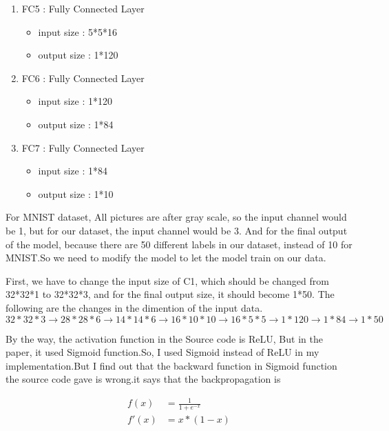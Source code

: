 \documentclass[conference]{IEEEtran}
\begin{document}
\begin{enumerate}
\begin{itemize}
        \end{itemize}
        \item FC5 : Fully Connected Layer
        \begin{itemize}
            \item input size : 5*5*16
            \item output size : 1*120
        \end{itemize}
        \item FC6 : Fully Connected Layer
        \begin{itemize}
            \item input size : 1*120
            \item output size : 1*84
        \end{itemize}
        \item FC7 : Fully Connected Layer
        \begin{itemize}
            \item input size : 1*84
            \item output size : 1*10
        \end{itemize}         
    \end{enumerate}
    For MNIST dataset, All pictures are after gray scale, so the input channel would be 1, but for our dataset, the input channel would be 3. And for the final output of the model, because there are 50 different labels in our dataset, instead of 10 for MNIST.So we need to modify the model to let the model train on our data.
    
    \indent First, we have to change the input size of C1, which should be changed from 32*32*1 to 32*32*3, and for the final output size, it should become 1*50. The following are the changes in the dimention of the input data. $32*32*3 \rightarrow 28*28*6 \rightarrow 14*14*6 \rightarrow 16*10*10 \rightarrow  16*5*5 \rightarrow  1*120 \rightarrow 1*84 \rightarrow 1*50$
    
    \indent By the way, the activation function in the Source code is ReLU, But in the paper, it used Sigmoid function.So, I used Sigmoid instead of ReLU in my implementation.But I find out that the backward function in Sigmoid function the source code gave is wrong.it says that the backpropagation is
    
    \begin{equation}
        \begin{aligned}
            f(x) &= \frac{1}{1 + e^{-x}} \\
            f'(x) &= x * (1 - x)
        \end{aligned}
    \end{equation}
    
\end{document}
